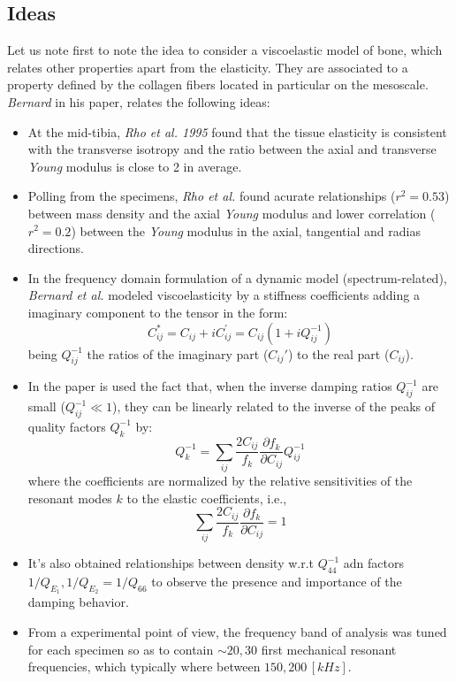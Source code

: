 \subsection{Ideas}
Let us note first to note the idea to consider a viscoelastic model of bone, which relates other properties apart from the elasticity. They are associated to a property defined by the collagen fibers located in particular on the mesoscale.\\
\textit{Bernard} in his paper, relates the following ideas:
\begin{itemize}
    \item At the mid-tibia, \textit{Rho et al. 1995} found that the tissue elasticity is consistent with the transverse isotropy and the ratio between the axial and transverse \textit{Young} modulus is close to 2 in average.
    \item Polling from the specimens, \textit{Rho et al.} found acurate relationships ($r^2 = 0.53$) between mass density and the axial \textit{Young} modulus and lower correlation ($r^2 = 0.2$) between the \textit{Young} modulus in the axial, tangential and radias directions.
    \item In the frequency domain formulation of a dynamic model (spectrum-related), \textit{Bernard et al.} modeled viscoelasticity by a stiffness coefficients adding a imaginary component to the tensor in the form:
    \begin{equation*}
        C^*_{ij} = C_{ij} + i C_{ij}^{'} = C_{ij} (1+ iQ_{ij}^{-1})
    \end{equation*}
    being $Q^{-1}_{ij}$ the ratios of the imaginary part ($C_{ij}'$) to the real part ($C_{ij}$).
    \item In the paper is used the fact that, when the inverse damping ratios $Q_{ij}^{-1}$ are small ($Q_{ij}^{-1} \ll 1$), they can be linearly related to the inverse of the peaks of quality factors $Q_k^{-1}$ by:
    \begin{equation*}
        Q_{k}^{-1} = \sum_{ij} \frac{2 C_{ij}}{f_k} \frac{\partial f_k}{\partial C_{ij}} Q_{ij}^{-1}
    \end{equation*}
    where the coefficients are normalized by the relative sensitivities of the resonant modes $k$ to the elastic coefficients, i.e.,
    \begin{equation*}
        \sum_{ij} \frac{2C_{ij}}{f_k}\frac{\partial f_k}{\partial C_{ij}} = 1
    \end{equation*}
    \item It's also obtained relationships between density w.r.t $Q_{44}^{-1}$ adn factors $1/Q_{E_1}, 1/Q_{E_2}=1/Q_{66}$ to observe the presence and importance of the damping behavior.
    \item From a experimental point of view, the frequency band of analysis was tuned for each specimen so as to contain $\sim 20,30$ first mechanical resonant frequencies, which typically where between $150, 200 \, [kHz]$.
\end{itemize}

